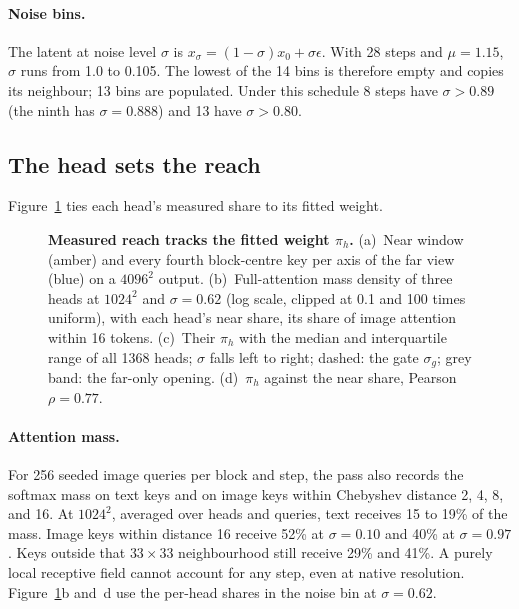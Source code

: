 \ifshortversion\else\paragraph{Noise bins.}\fi The latent at noise level $\sigma$ is $x_\sigma=(1-\sigma)x_0+\sigma\epsilon$. With 28 steps and $\mu=1.15$, $\sigma$ runs from 1.0 to 0.105. The lowest of the 14 bins is therefore empty and copies its neighbour; 13 bins are populated. Under this schedule 8 steps have $\sigma>0.89$ (the ninth has $\sigma=0.888$) and 13 have $\sigma>0.80$.

\subsection{The head sets the reach}
\label{app:emu_head}

Figure~\ref{fig:heads} ties each head's measured share to its fitted weight.


\begin{figure}[!htbp]
  \centering
  \caption{\textbf{Measured reach tracks the fitted weight $\pi_h$.} (a)~Near window (amber) and every fourth block-centre key per axis of the far view (blue) on a $4096^2$ output. (b)~Full-attention mass density of three heads at $1024^2$ and $\sigma=0.62$ (log scale, clipped at 0.1 and 100 times uniform), with each head's near share, its share of image attention within 16 tokens. (c)~Their $\pi_h$ with the median and interquartile range of all 1368 heads; $\sigma$ falls left to right; dashed: the gate $\sigma_g$; grey band: the far-only opening. (d)~$\pi_h$ against the near share, Pearson $\rho=0.77$.}
  \label{fig:heads}
\end{figure}

\paragraph{Attention mass.} For 256 seeded image queries per block and step, the pass also records the softmax mass on text keys and on image keys within Chebyshev distance 2, 4, 8, and 16. At $1024^2$, averaged over heads and queries, text receives 15 to 19\% of the mass. Image keys within distance 16 receive 52\% at $\sigma=0.10$ and 40\% at $\sigma=0.97$. Keys outside that $33\times33$ neighbourhood still receive 29\% and 41\%. A purely local receptive field cannot account for any step, even at native resolution. Figure~\ref{fig:heads}b and~d use the per-head shares in the noise bin at $\sigma=0.62$.

